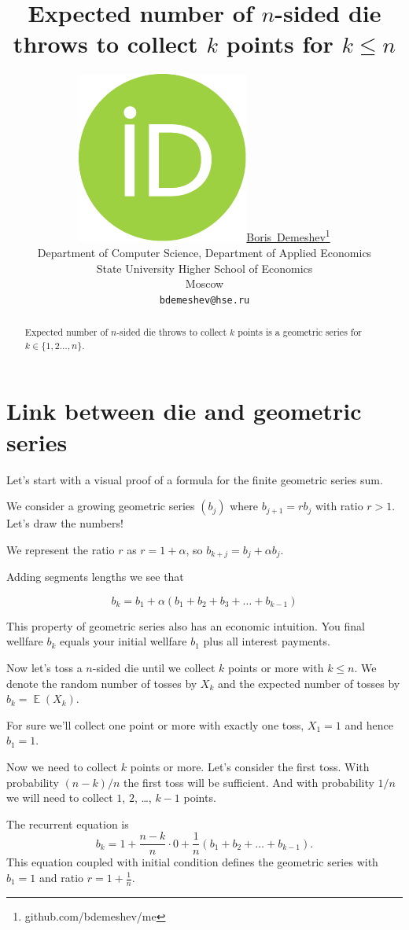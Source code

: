 \documentclass{article}
\title{Expected number of $n$-sided die throws to collect $k$ points for $k\leq n$}
\author{ \href{https://orcid.org/0000-0003-2284-3204}{\includegraphics[scale=0.06]{orcid.pdf}\hspace{1mm}Boris~Demeshev}\thanks{github.com/bdemeshev/me} \\
	Department of Computer Science, Department of Applied Economics\\
	State University Higher School of Economics\\
	Moscow \\
	\texttt{bdemeshev@hse.ru} \\
}
\DeclareMathOperator{\E}{\mathbb{E}}
\begin{document}
\maketitle

\begin{abstract}
	Expected number of $n$-sided die throws to collect $k$ points 
	is a geometric series for $k \in \{1, 2 \ldots, n\}$.
\end{abstract}




\section{Link between die and geometric series}
Let's start with a visual proof of a formula for the finite geometric series sum.

We consider a growing geometric series $(b_j)$ where $b_{j+1} = r b_j$ with ratio $r > 1$.
Let's draw the numbers!


We represent the ratio $r$ as $r = 1 + \alpha$, so $b_{k+j} = b_j + \alpha b_j$.


Adding segments lengths we see that

\[
b_{k} = b_1 + \alpha (b_1 + b_2 + b_3 + \ldots + b_{k-1})
\]

This property of geometric series also has an economic intuition. 
You final wellfare $b_k$ equals your initial wellfare $b_1$ plus all interest payments.


Now let's toss a $n$-sided die until we collect $k$ points or more with $k\leq n$.
We denote the random number of tosses by $X_k$ and the expected number of tosses 
by $b_k = \E(X_k)$. 

For sure we'll collect one point or more with exactly one toss, $X_1 = 1$ and hence $b_1 = 1$. 

Now we need to collect $k$ points or more. Let's consider the first toss.
With probability $(n - k)/n$ the first toss will be sufficient. 
And with probability $1/n$ we will need to collect $1$, $2$, \ldots, $k-1$ points.

The recurrent equation is
\[
b_k = 1 + \frac{n - k}{n} \cdot 0 + \frac{1}{n} (b_1 + b_2 + \ldots + b_{k-1}).
\]
This equation coupled with initial condition defines the geometric series with $b_1 = 1$ and ratio $r = 1 + \frac{1}{n}$.
\end{document}
